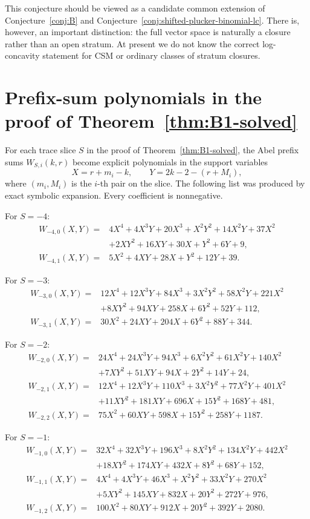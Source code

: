 \documentclass[11pt]{amsart}
\numberwithin{equation}{section}
\theoremstyle{remark}
\begin{document}
This conjecture should be viewed as a candidate common extension of
Conjecture~\ref{conj:B} and Conjecture~\ref{conj:shifted-plucker-binomial-lc}.
There is, however, an important distinction: the full vector space is naturally a
closure rather than an open stratum.  At present we do not know the correct
log-concavity statement for CSM or ordinary classes of stratum closures.
\appendix
\section{Prefix-sum polynomials in the proof of Theorem~\texorpdfstring{\ref{thm:B1-solved}}{B1}}\label{app:prefix}

For each trace slice $S$ in the proof of Theorem~\ref{thm:B1-solved}, the Abel prefix sums $W_{S,i}(k,r)$ become explicit polynomials in the support variables
\[
  X=r+m_i-k,\qquad Y=2k-2-(r+M_i),
\]
where $(m_i,M_i)$ is the $i$-th pair on the slice.  The following list was produced by exact symbolic expansion.  Every coefficient is nonnegative.

For $S=-4$:
\begin{align*}
W_{-4,0}(X,Y)={}&4X^4+4X^3Y+20X^3+X^2Y^2+14X^2Y+37X^2\\
&+2XY^2+16XY+30X+Y^2+6Y+9,\\
W_{-4,1}(X,Y)={}&5X^2+4XY+28X+Y^2+12Y+39.
\end{align*}

For $S=-3$:
\begin{align*}
W_{-3,0}(X,Y)={}&12X^4+12X^3Y+84X^3+3X^2Y^2+58X^2Y+221X^2\\
&+8XY^2+94XY+258X+6Y^2+52Y+112,\\
W_{-3,1}(X,Y)={}&30X^2+24XY+204X+6Y^2+88Y+344.
\end{align*}

For $S=-2$:
\begin{align*}
W_{-2,0}(X,Y)={}&24X^4+24X^3Y+94X^3+6X^2Y^2+61X^2Y+140X^2\\
&+7XY^2+51XY+94X+2Y^2+14Y+24,\\
W_{-2,1}(X,Y)={}&12X^4+12X^3Y+110X^3+3X^2Y^2+77X^2Y+401X^2\\
&+11XY^2+181XY+696X+15Y^2+168Y+481,\\
W_{-2,2}(X,Y)={}&75X^2+60XY+598X+15Y^2+258Y+1187.
\end{align*}

For $S=-1$:
\begin{align*}
W_{-1,0}(X,Y)={}&32X^4+32X^3Y+196X^3+8X^2Y^2+134X^2Y+442X^2\\
&+18XY^2+174XY+432X+8Y^2+68Y+152,\\
W_{-1,1}(X,Y)={}&4X^4+4X^3Y+46X^3+X^2Y^2+33X^2Y+270X^2\\
&+5XY^2+145XY+832X+20Y^2+272Y+976,\\
W_{-1,2}(X,Y)={}&100X^2+80XY+912X+20Y^2+392Y+2080.
\end{align*}
\end{document}
